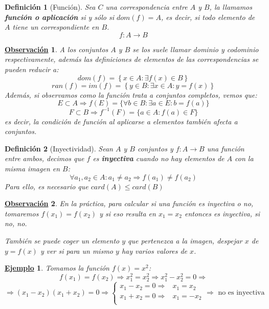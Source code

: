 \documentclass[10pt,a4paper,openright]{book}
\theoremstyle{break}
\newtheorem{defi}{Definición}[chapter]
\newtheorem{obs}{\underline{Observación}}[chapter]
\newtheorem{ej}{\underline{Ejemplo}}[chapter]
\begin{document}
\begin{defi}[Función]
Sea $C$ una correspondencia entre $A$ y $B$, la llamamos \textbf{función o aplicación} si y sólo si $dom(f)=A$, es decir, si todo elemento de $A$ tiene un correspondiente en $B$.
$$f: A\rightarrow B$$
\end{defi}

\begin{obs}
A los conjuntos $A$ y $B$ se los suele llamar dominio y codominio respectivamente, además las definiciones de elementos de las correspondencias se pueden reducir a:
$$dom(f)=\left\lbrace x \in A : \exists f(x)\in B\right\rbrace$$
$$ran(f)=im(f)=\left\lbrace y\in B : \exists x \in A : y=f(x)\right\rbrace$$
Además, si observamos como la función trata a conjuntos completos, vemos que:
$$E\subset A\Rightarrow f(E)=\{\forall b\in B : \exists a \in E : b=f(a)\}$$
$$F\subset B\Rightarrow f^{-1}(F)=\{a \in A : f(a)\in F\}$$
es decir, la condición de función al aplicarse a elementos también afecta a conjuntos.
\end{obs}

\begin{defi}[Inyectividad]
Sean $A$ y $B$ conjuntos y $f: A \rightarrow B$ una función entre ambos, decimos que $f$ es \textbf{inyectiva} cuando no hay elementos de $A$ con la misma imagen en $B$:
$$\forall a_1, a_2 \in A : a_1 \neq a_2\Rightarrow f(a_1)\neq f(a_2)$$
Para ello, es necesario que $card(A)\leq card(B)$
\end{defi}

\begin{obs}
En la práctica, para calcular si una función es inyectiva o no, tomaremos $f(x_1)=f(x_2)$ y si eso resulta en $x_1=x_2$ entonces es inyectiva, si no, no.

También se puede coger un elemento $y$ que pertenezca a la imagen, despejar $x$ de $y=f(x)$ y ver si para un mismo $y$ hay varios valores de $x$.
\end{obs}

\begin{ej}
Tomamos la función $f(x)=x^2$:
$$f(x_1)=f(x_2)\Rightarrow x_1^2=x_2^2\Rightarrow x_1^2-x_2^2=0 \Rightarrow$$
$$\Rightarrow (x_1-x_2)(x_1+x_2)=0 \Rightarrow
\begin{cases}
x_1-x_2=0 \Rightarrow & x_1=x_2 \\
x_1+x_2=0 \Rightarrow & x_1=-x_2 \\
\end{cases}
\Rightarrow \mbox{ no es inyectiva}$$
\end{ej}
\end{document}
